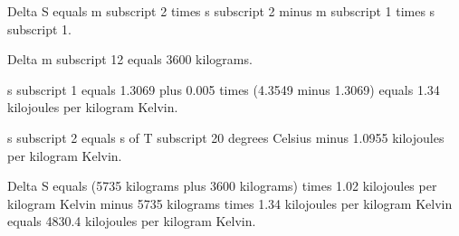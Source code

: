 Delta S equals m subscript 2 times s subscript 2 minus m subscript 1 times s subscript 1.

Delta m subscript 12 equals 3600 kilograms.

s subscript 1 equals 1.3069 plus 0.005 times (4.3549 minus 1.3069) equals 1.34 kilojoules per kilogram Kelvin.

s subscript 2 equals s of T subscript 20 degrees Celsius minus 1.0955 kilojoules per kilogram Kelvin.

Delta S equals (5735 kilograms plus 3600 kilograms) times 1.02 kilojoules per kilogram Kelvin minus 5735 kilograms times 1.34 kilojoules per kilogram Kelvin equals 4830.4 kilojoules per kilogram Kelvin.